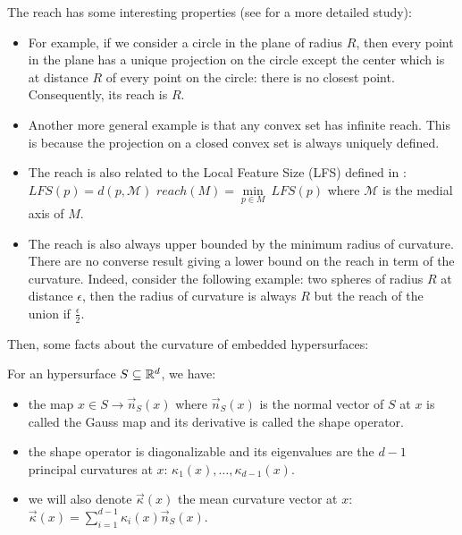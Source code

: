 The reach has some interesting properties (see \cite{merigot2009detection} for a
more detailed study):

\begin{itemize}
    \item For example, if we consider a circle in the plane of radius $ R $,
        then every point in the plane has a unique projection on the circle
        except the center which is at distance $ R $ of every point on the
        circle: there is no closest point.  Consequently, its reach is $ R $.

    \item Another more general example is that any convex set has infinite
        reach. This is because the projection on a closed convex set is always
        uniquely defined.

    \item The reach is also related to the Local Feature Size (LFS) defined in
        \cite{amenta1999surface}: $ LFS(p) = d(p, \mathcal{M}) $ $ reach(M) =
        \min\limits_{p \in M}~LFS(p) $ where $ \mathcal{M}  $ is the medial axis
        of $ M $.

    \item The reach is also always upper bounded by the minimum radius of
        curvature. There are no converse result giving a lower bound on the
        reach in term of the curvature. Indeed, consider the
        following example: two spheres of radius $ R $ at distance $ \epsilon $,
        then the radius of curvature is always $ R $ but the reach of the union
        if $ \frac{\epsilon}{2} $.
\end{itemize}

Then, some facts about the curvature of embedded hypersurfaces:

\begin{definition}
    For an hypersurface $ S \subseteq \mathbb{R}^d $, we have:

   \begin{itemize}
       \item the map $ x \in S \rightarrow \vec{n}_S(x) $ where $ \vec{n}_S(x)
           $ is the normal vector of $ S $ at $ x $ is called the Gauss map
           and its derivative is called the shape operator.

       \item the shape operator is diagonalizable and its eigenvalues are the $
           d-1 $ principal curvatures at $ x $: $ \kappa_1(x), \ldots,
           \kappa_{d-1}(x) $.

       \item we will also denote $ \vec{\kappa}(x) $ the mean curvature vector
           at $ x $: $ \vec{\kappa}(x) = \sum_{i=1}^{d-1} \kappa_i(x)
           \vec{n}_S(x) $.
   \end{itemize}

   \label{prop:curvatures-surface}
\end{definition}

